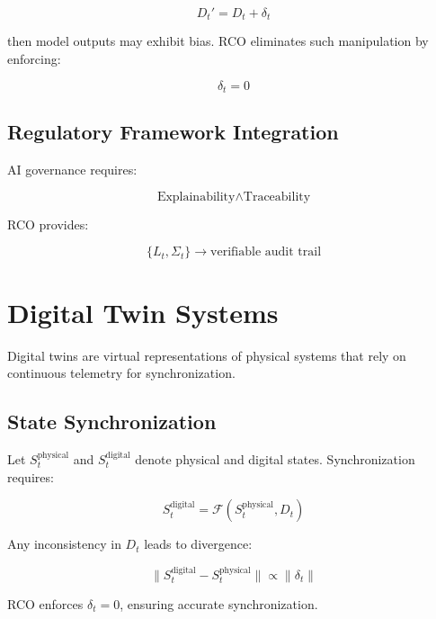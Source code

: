 \begin{equation}
D_t' = D_t + \delta_t
\end{equation}

then model outputs may exhibit bias. RCO eliminates such manipulation by enforcing:

\begin{equation}
\delta_t = 0
\end{equation}

\subsection{Regulatory Framework Integration}

AI governance requires:

\begin{equation}
\text{Explainability} \land \text{Traceability}
\end{equation}

RCO provides:

\begin{equation}
\{L_t, \Sigma_t\} \rightarrow \text{verifiable audit trail}
\end{equation}

\section{Digital Twin Systems}

Digital twins are virtual representations of physical systems that rely on continuous telemetry for synchronization.

\subsection{State Synchronization}

Let $S_t^{\text{physical}}$ and $S_t^{\text{digital}}$ denote physical and digital states. Synchronization requires:

\begin{equation}
S_t^{\text{digital}} = \mathcal{F}(S_t^{\text{physical}}, D_t)
\end{equation}

Any inconsistency in $D_t$ leads to divergence:

\begin{equation}
\|S_t^{\text{digital}} - S_t^{\text{physical}}\| \propto \|\delta_t\|
\end{equation}

RCO enforces $\delta_t = 0$, ensuring accurate synchronization.

